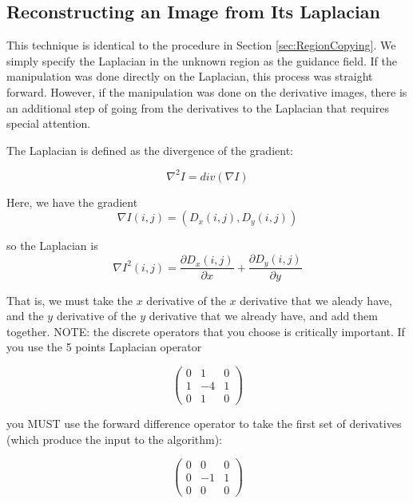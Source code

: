 \documentclass{InsightArticle}
\begin{document}
\subsection{Reconstructing an Image from Its Laplacian}
\label{sec:ReconstructingFromLaplacian}
This technique is identical to the procedure in Section \ref{sec:RegionCopying}. We simply specify the Laplacian in the unknown region as the guidance field. If the manipulation was done directly on the Laplacian, this process was straight forward. However, if the manipulation was done on the derivative images, there is an additional step of going from the derivatives to the Laplacian that requires special attention.

The Laplacian is defined as the divergence of the gradient:

\begin{equation}
\nabla^2 I = div(\nabla I)
\end{equation}

Here, we have the gradient 
\begin{equation}
\nabla I (i,j) = (D_x(i,j), D_y(i,j)) 
\end{equation}

so the Laplacian is 
\begin{equation}
\nabla I^2(i,j) = \frac{\partial D_x(i,j)}{\partial x} + \frac{\partial D_y(i,j)}{\partial y}
\end{equation}

That is, we must take the $x$ derivative of the $x$ derivative that we aleady have, and the $y$ derivative of the $y$ derivative that we already have, and add them together. NOTE: the discrete operators that you choose is critically important. If you use the 5 points Laplacian operator

\begin{equation}
\begin{pmatrix}
0 & 1 & 0 \\
1 & -4 & 1\\
0 & 1 & 0
\end{pmatrix}
\end{equation}

you MUST use the forward difference operator to take the first set of derivatives (which produce the input to the algorithm):

\begin{equation}
\begin{pmatrix}
0 & 0 & 0 \\
0 & -1 & 1\\
0 & 0 & 0
\end{pmatrix}
\end{equation}
\end{document}
